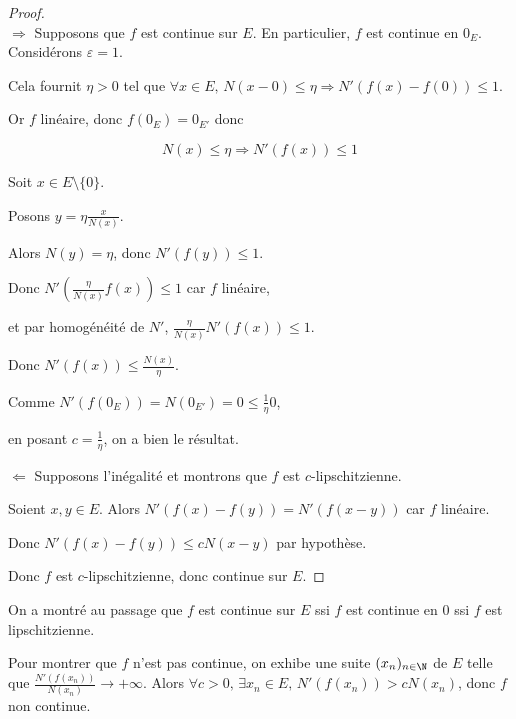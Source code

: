 
\begin{proof}~\\
    $\Rightarrow$ Supposons que $f$ est continue sur $E$. En particulier, $f$ est 
    continue en $0_E$. Considérons $\varepsilon = 1$.

    Cela fournit $\eta > 0$ tel que $\forall x \in E, \, N(x - 0) \leqslant \eta \Rightarrow N'(f(x) - f(0)) \leqslant 1$.

    Or $f$ linéaire, donc $f(0_E) = 0_{E'}$ donc 
    
    $$N(x) \leqslant \eta \Rightarrow N'(f(x)) \leqslant 1$$

    Soit $x \in E \setminus \{0\}$. 
    
    Posons $\displaystyle y = \eta \frac {x}{N(x)} $.

    Alors $N(y) = \eta$, donc $N'(f(y)) \leqslant 1$.

    Donc $N'\left( \frac{\eta }{N(x)} f(x) \right) \leqslant 1$ car $f$ linéaire, 
    
    et par homogénéité de $N'$, $ \frac{\eta }{N(x)} N'(f(x)) \leqslant 1$.

    Donc $N'(f(x)) \leqslant \frac{N(x)}{\eta}$.

    Comme $N'(f(0_E)) = N(0_{E'}) = 0 \leqslant \frac 1 \eta 0 $, 
    
    en posant $c = \frac 1 \eta$, on a bien le résultat. 

    \lvspace $\Leftarrow$ Supposons l'inégalité et montrons que $f$ est $c$-lipschitzienne. 

    Soient $x, y \in E$. Alors $N'(f(x) - f(y)) = N'(f(x - y)) $ car $f$ linéaire.

    Donc $N'(f(x) - f(y)) \leqslant c N(x - y)$ par hypothèse. 

    Donc $f$ est $c$-lipschitzienne, donc continue sur $E$.
\end{proof}

\begin{remarque}
    On a montré au passage que $f$ est continue sur $E$ ssi $f$ est continue en $0$ ssi $f$ est lipschitzienne.  

    Pour montrer que $f$ n'est pas continue, on exhibe une suite $(x_n)_{n \in \N}$ de $E$ 
    telle que $\displaystyle \frac{N'(f(x_n))}{N(x_n)} \to + \infty$. Alors $\forall c > 0, \, \exists x_n \in E, \, N'(f(x_n)) > c N(x_n)$, 
    donc $f$ non continue.
\end{remarque}

